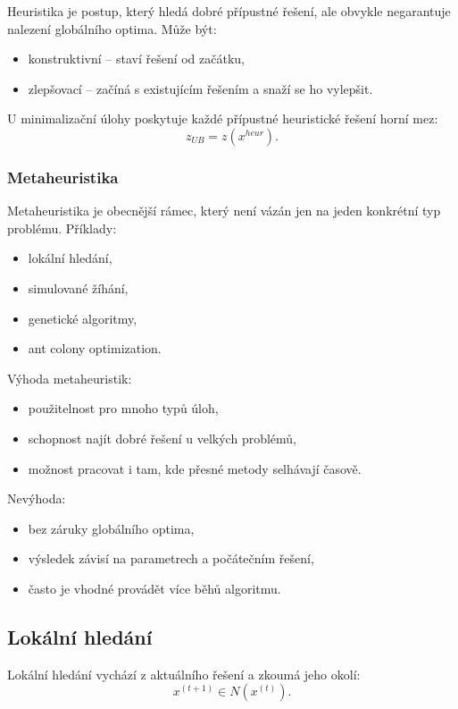 Heuristika je postup, který hledá dobré přípustné řešení, ale obvykle negarantuje nalezení globálního
optima. Může být:
\begin{itemize}
    \item konstruktivní -- staví řešení od začátku,
    \item zlepšovací -- začíná s existujícím řešením a snaží se ho vylepšit.
\end{itemize}

U minimalizační úlohy poskytuje každé přípustné heuristické řešení horní mez:
\[
z_{UB}=z(x^{heur}).
\]

\subsubsection{Metaheuristika}

Metaheuristika je obecnější rámec, který není vázán jen na jeden konkrétní typ problému.
Příklady:
\begin{itemize}
    \item lokální hledání,
    \item simulované žíhání,
    \item genetické algoritmy,
    \item ant colony optimization.
\end{itemize}

Výhoda metaheuristik:
\begin{itemize}
    \item použitelnost pro mnoho typů úloh,
    \item schopnost najít dobré řešení u velkých problémů,
    \item možnost pracovat i tam, kde přesné metody selhávají časově.
\end{itemize}

Nevýhoda:
\begin{itemize}
    \item bez záruky globálního optima,
    \item výsledek závisí na parametrech a počátečním řešení,
    \item často je vhodné provádět více běhů algoritmu.
\end{itemize}

\subsection{Lokální hledání}

Lokální hledání vychází z aktuálního řešení a zkoumá jeho okolí:
\[
x^{(t+1)}\in N(x^{(t)}).
\]

